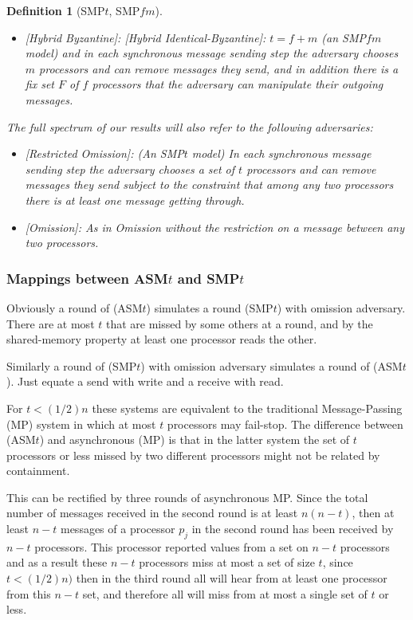 \documentclass[11pt]{article}
\newtheorem{definition}{Definition}
\newcommand{\SMPfm}{\mbox{SMP\!$f\!m$}\xspace}
\begin{document}
{\begin{definition}[SMP$t$, \SMPfm]
\begin{itemize}
\item
\textup{ [Hybrid Byzantine]:}
\textup{ [Hybrid Identical-Byzantine]:} $t=f+m$  (an \SMPfm model) and in each synchronous message sending step the adversary chooses $m$ processors and can remove  messages they send, and in addition there is a fix set $F$ of $f$ processors that the adversary can manipulate their outgoing messages.
\end{itemize}
 The full spectrum of our results will also refer to the following adversaries:
 \begin{itemize}
 \item
\textup{ [Restricted Omission]: } (An SMP$t$ model) In each synchronous message sending step the adversary chooses a set of $t$ processors and can remove messages they send subject to the constraint that among any two processors there is at least one message getting through.
 \item
\textup{ [Omission]:}  As in Omission without the restriction on a message between any two processors.
  \end{itemize}

\end{definition}


\subsubsection*{Mappings between ASM$t$ and SMP$t$ }
Obviously a round of (ASM$t$) simulates a round (SMP$t$) with omission adversary. There are at most $t$ that are missed by some others at a round, and by the shared-memory property at least one processor reads the other.

Similarly a round of (SMP$t$) with omission adversary simulates a round of (ASM$t$). Just equate a send with write and a receive with read.

For $t< (1/2)n$ these systems are equivalent to the traditional Message-Passing (MP) system in which at most $t$
processors may fail-stop. The difference between (ASM$t$) and asynchronous (MP) is that in the latter system
the set of $t$ processors or less missed by two different processors might not be related by containment.

This can be rectified by three rounds of asynchronous MP. Since the total number of messages received
in the second round is at least $n(n-t)$, then at least $n-t$ messages of a processor $p_j$ in the second round 
has been received by $n-t$ processors. This processor reported values from a set on $n-t$ processors and
as a result these $n-t$ processors miss at most a set of size $t$, since $t<(1/2)n)$ then in the third round all
will hear from at least one processor from this $n-t$ set, and therefore all will miss from at most a single set
of $t$ or less.



}
\end{document}
